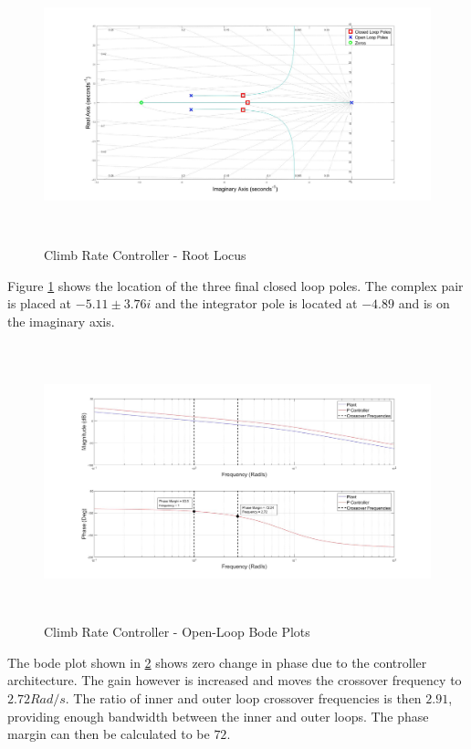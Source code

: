 	 \begin{figure}[H]
	 	\centering
	 	\includegraphics[height = 8cm]{../Design/Matlab/Controllers/climb_rate_root.jpg}
	 	\caption{Climb Rate Controller -  Root Locus}
	 	\label{IM_ClimbRateRoot}
	 \end{figure}
	 
	 Figure \ref{IM_ClimbRateRoot} shows the location of the three final closed loop poles. The complex pair is placed at $-5.11 \pm 3.76i$ and the integrator pole is located at $-4.89$ and is on the imaginary axis.
	 
	 \begin{figure}[H]
	 	\centering
	 	\includegraphics[height = 8cm]{../Design/Matlab/Controllers/climb_rate_bode.jpg}
	 	\caption{Climb Rate Controller - Open-Loop Bode Plots}
	 	\label{IM_ClimbRateBode}
	 \end{figure}
	 
	 The bode plot shown in \ref{IM_ClimbRateBode} shows zero change in phase due to the controller architecture. The gain however is increased and moves the crossover frequency to $2.72 Rad/s$. The ratio of inner and outer loop crossover frequencies is then $2.91$, providing enough bandwidth between the inner and outer loops. The phase margin can then be calculated to be $72$\textdegree. 
	 
